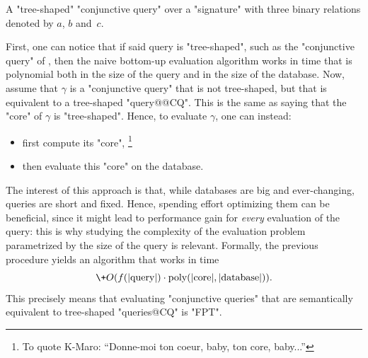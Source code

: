 \begin{marginfigure}
	\centering
	\caption{
		\AP\label{fig:intro-tree-shaped-CQ}
		A "tree-shaped" "conjunctive query" over a "signature"
		with three binary relations denoted by $a$, $b$ and~$c$.
	}
\end{marginfigure}
First, one can notice that if said query is "tree-shaped",
such as the "conjunctive query" of , then the naive
bottom-up evaluation algorithm works in time that is polynomial both
in the size of the query and in the size of the database.
Now, assume that $\gamma$ is a "conjunctive query" that is not
tree-shaped, but that is equivalent to a tree-shaped "query@@CQ".
This is the same as saying that the "core" of $\gamma$ is "tree-shaped".
Hence, to evaluate $\gamma$, one can instead:
\begin{itemize}
	\item first compute its "core",%
	\footnote{To quote K-Maro: ``Donne-moi ton coeur, baby, ton core, baby...''}
	\item then evaluate this "core" on the database.
\end{itemize}
The interest of this approach is that, while databases are big and ever-changing,
queries are short and fixed. Hence, spending effort optimizing them can be beneficial,
since it might lead to performance gain
for \emph{every} evaluation of the query: this is why studying the
complexity of the evaluation problem parametrized by the size of
the query is relevant.
Formally, the previous procedure yields an algorithm that works in time
\[
	\+O(f(|\text{query}|) \cdot \poly(|\text{core}|, |\text{database}|)).
\]
This precisely means that evaluating "conjunctive queries" that are semantically equivalent to
tree-shaped "queries@CQ" is "FPT".


